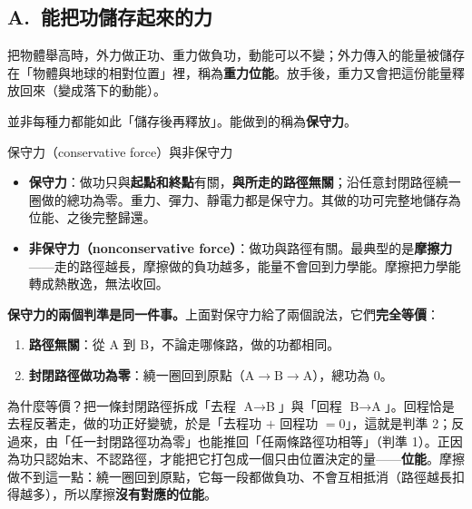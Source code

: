 \documentclass[11pt]{article}
\begin{document}
\subsection*{\sffamily A.\ 能把功儲存起來的力}

把物體舉高時，外力做正功、重力做負功，動能可以不變；外力傳入的能量被儲存在「物體與地球的相對位置」裡，稱為\textbf{重力位能}。放手後，重力又會把這份能量釋放回來（變成落下的動能）。

並非每種力都能如此「儲存後再釋放」。能做到的稱為\textbf{保守力}。

\begin{補充框}{保守力（conservative force）與非保守力}
\begin{itemize}\setlength{\itemsep}{1pt}
\item \textbf{保守力}：做功只與\textbf{起點和終點}有關，\textbf{與所走的路徑無關}；沿任意封閉路徑繞一圈做的總功為零。重力、彈力、靜電力都是保守力。其做的功可完整地儲存為位能、之後完整歸還。
\item \textbf{非保守力（nonconservative force）}：做功與路徑有關。最典型的是\textbf{摩擦力}——走的路徑越長，摩擦做的負功越多，能量不會回到力學能。摩擦把力學能轉成熱散逸，無法收回。
\end{itemize}

\textbf{保守力的兩個判準是同一件事。}上面對保守力給了兩個說法，它們\textbf{完全等價}：
\begin{enumerate}\setlength{\itemsep}{1pt}
\item \textbf{路徑無關}：從 A 到 B，不論走哪條路，做的功都相同。
\item \textbf{封閉路徑做功為零}：繞一圈回到原點（$\text{A}\to\text{B}\to\text{A}$），總功為 $0$。
\end{enumerate}
為什麼等價？把一條封閉路徑拆成「去程 $\text{A}\to\text{B}$」與「回程 $\text{B}\to\text{A}$」。回程恰是去程反著走，做的功正好變號，於是「去程功 $+$ 回程功 $=0$」，這就是判準 2；反過來，由「任一封閉路徑功為零」也能推回「任兩條路徑功相等」（判準 1）。正因為功只認始末、不認路徑，才能把它打包成一個只由位置決定的量——\textbf{位能}。摩擦做不到這一點：繞一圈回到原點，它每一段都做負功、不會互相抵消（路徑越長扣得越多），所以摩擦\textbf{沒有對應的位能}。
\end{補充框}


\end{document}
